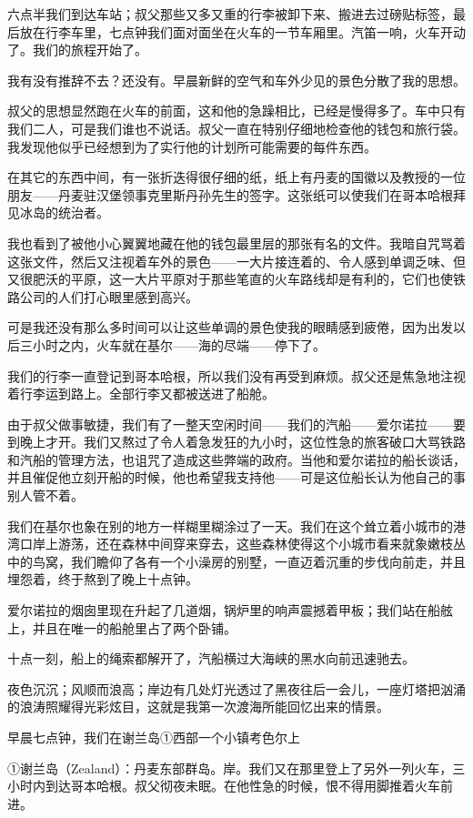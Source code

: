 \documentclass[10pt]{book}
\begin{document}
六点半我们到达车站；叔父那些又多又重的行李被卸下来、搬进去过磅贴标签，最后放在行李车里，七点钟我们面对面坐在火车的一节车厢里。汽笛一响，火车开动了。我们的旅程开始了。

我有没有推辞不去？还没有。早晨新鲜的空气和车外少见的景色分散了我的思想。

叔父的思想显然跑在火车的前面，这和他的急躁相比，已经是慢得多了。车中只有我们二人，可是我们谁也不说话。叔父一直在特别仔细地检查他的钱包和旅行袋。我发现他似乎已经想到为了实行他的计划所可能需要的每件东西。

在其它的东西中间，有一张折迭得很仔细的纸，纸上有丹麦的国徽以及教授的一位朋友——丹麦驻汉堡领事克里斯丹孙先生的签字。这张纸可以使我们在哥本哈根拜见冰岛的统治者。

我也看到了被他小心翼翼地藏在他的钱包最里层的那张有名的文件。我暗自咒骂着这张文件，然后又注视着车外的景色——一大片接连着的、令人感到单调乏味、但又很肥沃的平原，这一大片平原对于那些笔直的火车路线却是有利的，它们也使铁路公司的人们打心眼里感到高兴。

可是我还没有那么多时间可以让这些单调的景色使我的眼睛感到疲倦，因为出发以后三小时之内，火车就在基尔——海的尽端——停下了。

我们的行李一直登记到哥本哈根，所以我们没有再受到麻烦。叔父还是焦急地注视着行李运到路上。全部行李又都被送进了船舱。

由于叔父做事敏捷，我们有了一整天空闲时间——我们的汽船——爱尔诺拉——要到晚上才开。我们又熬过了令人着急发狂的九小时，这位性急的旅客破口大骂铁路和汽船的管理方法，也诅咒了造成这些弊端的政府。当他和爱尔诺拉的船长谈话，并且催促他立刻开船的时候，他也希望我支持他——可是这位船长认为他自己的事别人管不着。

我们在基尔也象在别的地方一样糊里糊涂过了一天。我们在这个耸立着小城市的港湾口岸上游荡，还在森林中间穿来穿去，这些森林使得这个小城市看来就象嫩枝丛中的鸟窝，我们瞻仰了各有一个小澡房的别墅，一直迈着沉重的步伐向前走，并且埋怨着，终于熬到了晚上十点钟。

爱尔诺拉的烟囱里现在升起了几道烟，锅炉里的响声震撼着甲板；我们站在船舷上，并且在唯一的船舱里占了两个卧铺。

十点一刻，船上的绳索都解开了，汽船横过大海峡的黑水向前迅速驰去。

夜色沉沉；风顺而浪高；岸边有几处灯光透过了黑夜往后一会儿，一座灯塔把汹涌的浪涛照耀得光彩炫目，这就是我第一次渡海所能回忆出来的情景。

早晨七点钟，我们在谢兰岛①西部一个小镇考色尔上

①谢兰岛（Zealand）：丹麦东部群岛。岸。我们又在那里登上了另外一列火车，三小时内到达哥本哈根。叔父彻夜未眠。在他性急的时候，恨不得用脚推着火车前进。
\end{document}
